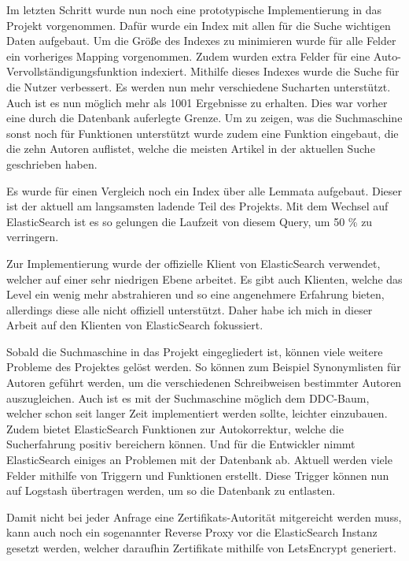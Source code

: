 Im letzten Schritt wurde nun noch eine prototypische Implementierung in das Projekt vorgenommen. Dafür wurde ein Index mit allen für die Suche wichtigen Daten aufgebaut. Um die Größe des Indexes zu minimieren wurde für alle Felder ein vorheriges Mapping vorgenommen. Zudem wurden extra Felder für eine Auto-Vervollständigungsfunktion indexiert. Mithilfe dieses Indexes wurde die Suche für die Nutzer verbessert. Es werden nun mehr verschiedene Sucharten unterstützt. Auch ist es nun möglich mehr als 1001 Ergebnisse zu erhalten. Dies war vorher eine durch die Datenbank auferlegte Grenze. Um zu zeigen, was die Suchmaschine sonst noch für Funktionen unterstützt wurde zudem eine Funktion eingebaut, die die zehn Autoren auflistet, welche die meisten Artikel in der aktuellen Suche geschrieben haben. 

Es wurde für einen Vergleich noch ein Index über alle Lemmata aufgebaut. Dieser ist der aktuell am langsamsten ladende Teil des Projekts. Mit dem Wechsel auf ElasticSearch ist es so gelungen die Laufzeit von diesem Query, um 50 \% zu verringern. 

Zur Implementierung wurde der offizielle Klient von ElasticSearch verwendet, welcher auf einer sehr niedrigen Ebene arbeitet. Es gibt auch Klienten, welche das Level ein wenig mehr abstrahieren und so eine angenehmere Erfahrung bieten, allerdings diese alle nicht offiziell unterstützt. Daher habe ich mich in dieser Arbeit auf den Klienten von ElasticSearch fokussiert. 

Sobald die Suchmaschine in das Projekt eingegliedert ist, können viele weitere Probleme des Projektes gelöst werden. So können zum Beispiel Synonymlisten für Autoren geführt werden, um die verschiedenen Schreibweisen bestimmter Autoren auszugleichen. Auch ist es mit der Suchmaschine möglich dem DDC-Baum, welcher schon seit langer Zeit implementiert werden sollte, leichter einzubauen. Zudem bietet ElasticSearch Funktionen zur Autokorrektur, welche die Sucherfahrung positiv bereichern können. Und für die Entwickler nimmt ElasticSearch einiges an Problemen mit der Datenbank ab. Aktuell werden viele Felder mithilfe von Triggern und Funktionen erstellt. Diese Trigger können nun auf Logstash übertragen werden, um so die Datenbank zu entlasten.

Damit nicht bei jeder Anfrage eine Zertifikats-Autorität mitgereicht werden muss, kann auch noch ein sogenannter Reverse Proxy vor die ElasticSearch Instanz gesetzt werden, welcher daraufhin Zertifikate mithilfe von LetsEncrypt generiert.